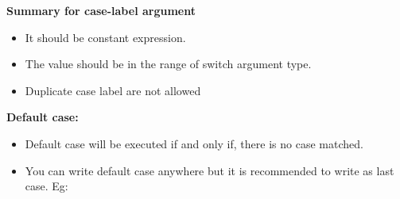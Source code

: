 \begin{flushleft}
	\textbf{Summary for case-label argument}
	\begin{itemize}
		\item It should be constant expression.
		\item The value should be in the range of switch argument type.
		\item Duplicate case label are not allowed
	\end{itemize}
	
	\item \textbf{Default case:}
	\begin{itemize}
			\item Default case will be executed if and only if, there is no case matched.
			\item You can write default case anywhere but it is recommended to write as last case. \newline
			Eg:
			\bigskip
		\end{itemize}
 
\end{flushleft}








